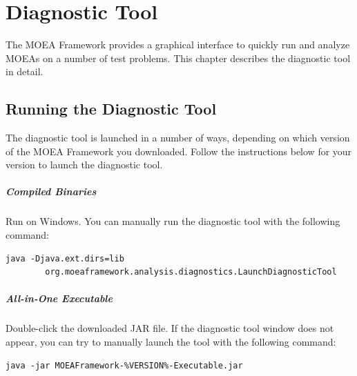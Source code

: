 %
%

\chapter{Diagnostic Tool}
The MOEA Framework provides a graphical interface to quickly run and analyze MOEAs on a number of test problems.  This chapter describes the diagnostic tool in detail.

\section{Running the Diagnostic Tool}
The diagnostic tool is launched in a number of ways, depending on which version of the MOEA Framework you downloaded.  Follow the instructions below for your version to launch the diagnostic tool.

\paragraph{Compiled Binaries}
Run  on Windows.  You can manually run the diagnostic tool with the following command:

\begin{lstlisting}[language=Plaintext]
java -Djava.ext.dirs=lib
		org.moeaframework.analysis.diagnostics.LaunchDiagnosticTool
\end{lstlisting}

\paragraph{All-in-One Executable}
Double-click the downloaded JAR file.  If the diagnostic tool window does not appear, you can try to manually launch the tool with the following command:

\begin{lstlisting}[language=Plaintext]
java -jar MOEAFramework-%VERSION%-Executable.jar
\end{lstlisting}

